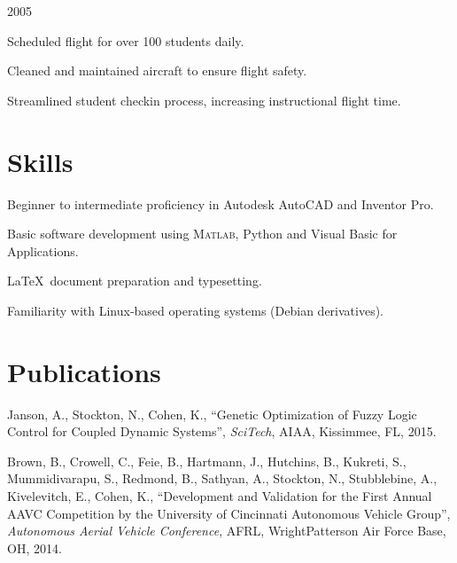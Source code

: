 \documentclass[letterpaper,10pt]{resume}
\begin{document}
	{2005}
	\begin{compactitem}
		\item Scheduled flight for over 100 students daily.
		\item Cleaned and maintained aircraft to ensure flight safety.
		\item Streamlined student check\textendash in process, increasing instructional flight time.
	\end{compactitem}


	\section{Skills}
	\begin{compactitem}
	\item Beginner to intermediate proficiency in Autodesk AutoCAD and Inventor Pro.
	\item Basic software development using \textsc{Matlab}, Python and Visual Basic for Applications.
	\item \LaTeX\ document preparation and typesetting.
	\item Familiarity with Linux-based operating systems (Debian derivatives).
	\end{compactitem}
	
	\section{Publications}
	\begin{compactitem}
		\item Janson, A., Stockton, N., Cohen, K., ``Genetic Optimization of Fuzzy Logic Control for Coupled Dynamic Systems'', \emph{SciTech}, AIAA, Kissimmee, FL, 2015.
		\item Brown, B., Crowell, C., Feie, B., Hartmann, J., Hutchins, B., Kukreti, S., Mummidivarapu, S., Redmond, B., Sathyan, A., Stockton, N., Stubblebine, A., Kivelevitch, E., Cohen, K., ``Development and Validation for the First Annual AAVC Competition by the University of Cincinnati Autonomous Vehicle Group'', \emph{Autonomous Aerial Vehicle Conference}, AFRL, Wright\textendash Patterson Air Force Base, OH, 2014.
	\end{compactitem}
\end{document}
